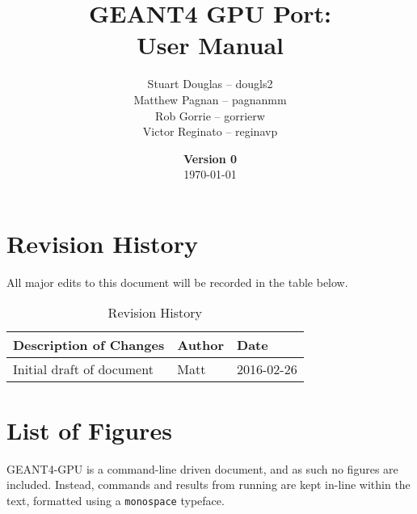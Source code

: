 \documentclass[12pt]{article}
\title{
\LARGE GEANT4 GPU Port:
\\\vspace{10mm}
\large \textbf{User Manual}
\vspace{40mm}
}
\author{
Stuart Douglas -- dougls2
\\Matthew Pagnan -- pagnanmm
\\Rob Gorrie -- gorrierw
\\Victor Reginato -- reginavp
\vspace{10mm}
}
\date{\vfill \textbf{Version 0}\\ \today}
\begin{document}

\maketitle
\newpage

\tableofcontents
\newpage
{}
\restoregeometry

\section{Revision History}
All major edits to this document will be recorded in the table below.

\begin{table}[h]
\centering
\caption{Revision History}\label{Table_Revision}
\begin{tabular}{lll}
\toprule
\bf Description of Changes & \bf Author & \bf Date\\\midrule
Initial draft of document & Matt & 2016-02-26\\
\bottomrule
\end{tabular}
\end{table}

\section{List of Figures}
GEANT4-GPU is a command-line driven document, and as such no figures are included. Instead, commands and results from running are kept in-line within the text, formatted using a \texttt{monospace} typeface.
\end{document}
